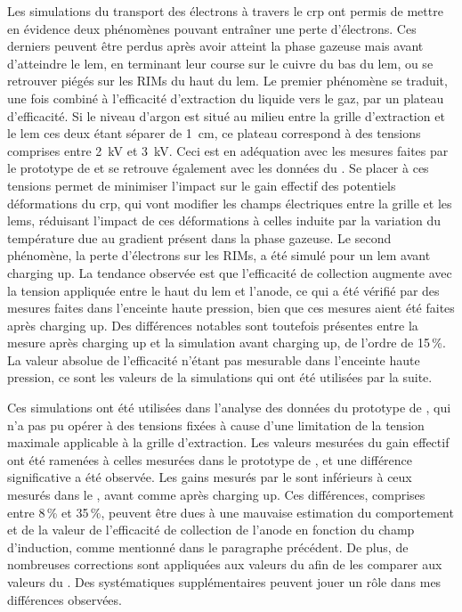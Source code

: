 Les simulations du transport des électrons à travers le \gls{crp} ont permis de mettre en évidence deux phénomènes pouvant entraîner une perte d'électrons. Ces derniers peuvent être perdus après avoir atteint la phase gazeuse mais avant d'atteindre le \gls{lem}, en terminant leur course sur le cuivre du bas du \gls{lem}, ou se retrouver piégés sur les RIMs du haut du \gls{lem}. Le premier phénomène se traduit, une fois combiné à l'efficacité d'extraction du liquide vers le gaz, par un plateau d'efficacité. Si le niveau d'argon est situé au milieu entre la grille d'extraction et le \gls{lem} ces deux étant séparer de \SI{1}{\centi\meter}, ce plateau correspond à des tensions comprises entre \SI{2}{\kilo\volt} et \SI{3}{\kilo\volt}. Ceci est en adéquation avec les mesures faites par le prototype de \threeL{} et se retrouve également avec les données du \TOO{}. Se placer à ces tensions permet de minimiser l'impact sur le gain effectif des potentiels déformations du \gls{crp}, qui vont modifier les champs électriques entre la grille et les \glspl{lem}, réduisant l'impact de ces déformations à celles induite par la variation du température due au gradient présent dans la phase gazeuse. Le second phénomène, la perte d'électrons sur les RIMs, a été simulé pour un \gls{lem} avant charging up. La tendance observée est que l'efficacité de collection augmente avec la tension appliquée entre le haut du \gls{lem} et l'anode, ce qui a été vérifié par des mesures faites dans l'enceinte haute pression, bien que ces mesures aient été faites après charging up. Des différences notables sont toutefois présentes entre la mesure après charging up et la simulation avant charging up, de l'ordre de 15\,\%. La valeur absolue de l'efficacité n'étant pas mesurable dans l'enceinte haute pression, ce sont les valeurs de la simulations qui ont été utilisées par la suite.

Ces simulations ont été utilisées dans l'analyse des données du prototype de \TOO{}, qui n'a pas pu opérer à des tensions fixées à cause d'une limitation de la tension maximale applicable à la grille d'extraction. Les valeurs mesurées du gain effectif ont été ramenées à celles mesurées dans le prototype de \threeL{}, et une différence significative a été observée. Les gains mesurés par le \TOO{} sont inférieurs à ceux mesurés dans le \threeL{}, avant comme après charging up. Ces différences, comprises entre 8\,\% et 35\,\%, peuvent être dues à une mauvaise estimation du comportement et de la valeur de l'efficacité de collection de l'anode en fonction du champ d'induction, comme mentionné dans le paragraphe précédent. De plus, de nombreuses corrections sont appliquées aux valeurs du \TOO{} afin de les comparer aux valeurs du \threeL{}. Des systématiques supplémentaires peuvent jouer un rôle dans mes différences observées. 

